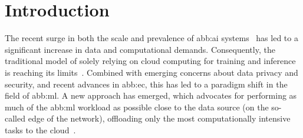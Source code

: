 \section{Introduction}\label{sec:introduction}

The recent surge in both the scale and prevalence of \gls{abb:ai} systems~\cite{murshedMachineLearningNetwork2022} has led to a significant increase in data and computational demands.
Consequently, the traditional model of solely relying on cloud computing for training and inference is reaching its limits~\cite{singhEdgeAISurvey2023}.
Combined with emerging concerns about data privacy and security, and recent advances in \gls{abb:ec}, this has led to a paradigm shift in the field of \gls{abb:ml}.
A new approach has emerged, which advocates for performing as much of the \gls{abb:ml} workload as possible close to the data source (on the so-called edge of the network), offloading only the most computationally intensive tasks to the cloud~\cite{wangEdgeAIConvergence2020}.
